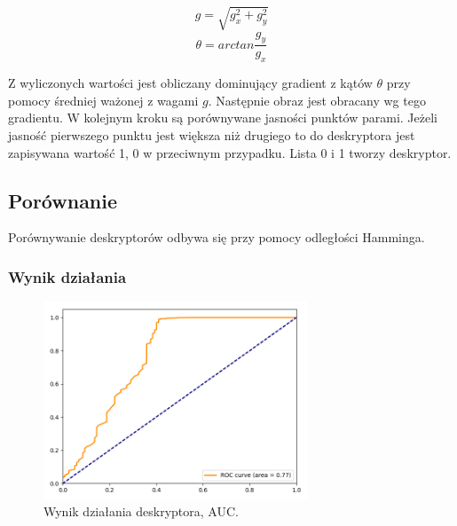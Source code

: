 \documentclass[a4paper,11pt]{article}
\begin{document}
$$ g = \sqrt{g_x^2 + g_y^2}$$
$$ \theta =arctan \frac{g_y}{g_x}$$

Z wyliczonych wartości jest obliczany dominujący gradient z kątów $\theta$ przy pomocy średniej ważonej z wagami $g$. Następnie obraz jest obracany wg tego gradientu. W kolejnym kroku są porównywane jasności punktów parami. Jeżeli jasność pierwszego punktu jest większa niż drugiego to do deskryptora jest zapisywana wartość 1, 0 w przeciwnym przypadku. Lista 0 i 1 tworzy deskryptor.


\subsection{Porównanie}
Porównywanie deskryptorów odbywa się przy pomocy odległości Hamminga.

\subsubsection{Wynik działania}

\begin{figure}[H]
\begin{center}
\includegraphics[width=0.7\textwidth]{./img/brief.png}
\end{center}
\caption{Wynik działania deskryptora, AUC.}
\end{figure}
\end{document}
